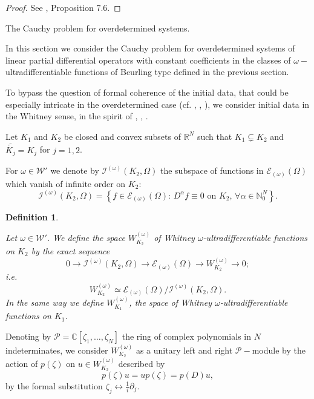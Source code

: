 \documentclass[twoside]{amsart}
\newtheorem{Def}[Th]{Definition}
\begin{document}
\begin{proof}
See \cite{BMT}, Proposition 7.6.
\end{proof}

{\setcounter{equation}{0}}{The Cauchy problem for overdetermined systems.}

In this section we consider the Cauchy problem for overdetermined
systems of linear partial differential operators with constant coefficients
in the classes of $\omega-$ultradifferentiable functions of Beurling
type defined
in the previous section.

To bypass the question of formal coherence of the initial data, that
could be especially intricate in the overdetermined case (cf. \cite{AHLM},
\cite{AN2}, \cite{N2}), we consider initial data in the Whitney
sense, in the spirit of \cite{N2}, \cite{BN1}, \cite{BN3}.

Let $K_{1}$ and $K_{2}$ be closed and convex subsets of ${\mathbb R}^N$ such
that $K_{1}\subsetneq K_{2}$ and $\overline{\mathring{K_{j}}}=K_{j}$
for $j=1,2$.

For $\omega\in{\mathcal{W}}'$ we denote by ${\mathcal{I}}^{(\omega)}(K_{2},\Omega)$ the subspace of
functions in ${\mathcal{E}}_{(\omega)}(\Omega)$ which vanish of infinite order on $K_{2}:$
\[
  {\mathcal{I}}^{(\omega)}(K_{2},\Omega)=\left\{ f\in{\mathcal{E}}_{(\omega)}(\Omega):\,
  D^{\alpha}f\equiv0\,\,\mbox{on}\,\,K_{2},\,\forall\alpha\in{\mathbb N}_{0}^{N}\right\} .
\]

\begin{Def}
  \begin{em}
    Let $\omega\in{\mathcal{W}}'$.
We define the space
$W_{K_{2}}^{(\omega)}$ of \emph{Whitney $\omega$-ultradifferentiable functions}
on $K_{2}$ by the exact sequence
\[
0\longrightarrow{\mathcal{I}}^{(\omega)}(K_{2},\Omega)\longrightarrow
{\mathcal{E}}_{(\omega)}(\Omega)\longrightarrow W_{K_{2}}^{(\omega)}\longrightarrow0;
\]
i.e.
\[
W_{K_{2}}^{(\omega)}\simeq{\mathcal{E}}_{(\omega)}(\Omega)\bigl/{\mathcal{I}}^{(\omega)}(K_{2},\Omega).
\]
In the same way we define $W_{K_{1}}^{(\omega)}$, the space of Whitney
$\omega$-ultradifferentiable functions on $K_{1}$.
\end{em}
\end{Def}

Denoting by $\mathcal P={\mathbb C}[\zeta_1,\ldots,\zeta_N]$ the ring
of complex polynomials
in $N$ indeterminates, we consider $W_{K_2}^{(\omega)}$ as a 
unitary left and right ${\mathcal P}-$module
by the action of $p(\zeta)$ on $u\in W_{K_2}^{(\omega)}$ described by
\[
p(\zeta)u=up(\zeta)=p(D)u,
\]
by the formal substitution $\zeta_j\leftrightarrow\frac1i\partial_j$.
\end{document}
